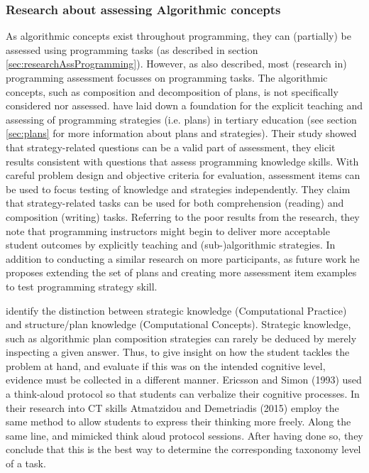 \subsubsection{Research about assessing Algorithmic concepts}
As algorithmic concepts exist throughout programming, they can (partially) be assessed using programming tasks (as described in section \ref{sec:researchAssProgramming}). However, as also described, most (research in) programming assessment focusses on programming tasks. The algorithmic concepts, such as composition and decomposition of plans, is not specifically considered nor assessed.  have laid down a foundation for the explicit teaching and assessing of programming strategies (i.e. plans) in tertiary education (see section \ref{sec:plans} for more information about plans and strategies). Their study showed that strategy-related questions can be a valid part of assessment, they elicit results consistent with questions that assess programming knowledge skills. With careful problem design and objective criteria for evaluation, assessment items can be used to focus testing of knowledge and strategies independently. They claim that strategy-related tasks can be used for both comprehension (reading) and composition (writing) tasks. Referring to the poor results from the  research, they note that programming instructors might begin to deliver more acceptable student outcomes by explicitly teaching and (sub-)algorithmic strategies. In addition to conducting a similar research on more participants, as future work he proposes extending the set of plans and creating more assessment item examples to test programming strategy skill.



\cite{BrennanResnick2012} identify the distinction between strategic knowledge (Computational Practice) and structure/plan knowledge (Computational Concepts). Strategic knowledge, such as algorithmic plan composition strategies can rarely be deduced by merely inspecting a given answer. Thus, to give insight on how the student tackles the problem at hand, and evaluate if this was on the intended cognitive level, evidence must be collected in a different manner.  Ericsson and Simon (1993) used a think-aloud protocol so that students can verbalize their cognitive processes. In their research into CT skills Atmatzidou and Demetriadis (2015) employ the same method to allow students to express their thinking more freely. Along the same line,  and  mimicked  think aloud protocol sessions. After having done so, they conclude that this is the best way to determine the corresponding taxonomy level of a task.



